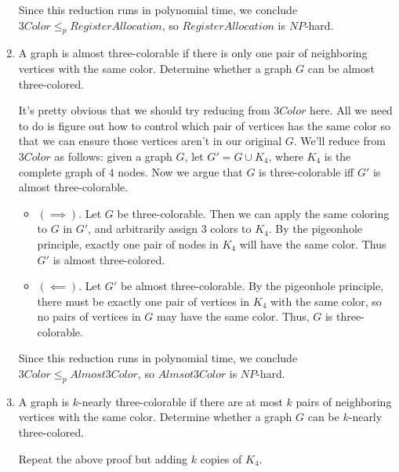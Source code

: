 \documentclass[fleqn]{article}
\begin{document}
\begin{enumerate}
\begin{answer}
\begin{itemize}
        \end{itemize}
        Since this reduction runs in polynomial time, we conclude $3Color \leq_p RegisterAllocation$, so $RegisterAllocation$ is $NP$-hard.
    \end{answer}
    \item A graph is almost three-colorable if there is only one pair of neighboring vertices with the same color. Determine whether a graph $G$ can be almost three-colored.
    \begin{answer}
        It's pretty obvious that we should try reducing from $3Color$ here. All we need to do is figure out how to control which pair of vertices has the same color so that we can ensure those vertices aren't in our original $G$. We'll reduce from $3Color$ as follows: given a graph $G$, let $G' = G \cup K_4$, where $K_4$ is the complete graph of $4$ nodes. Now we argue that $G$ is three-colorable iff $G'$ is almost three-colorable.
        \begin{itemize}
            \item $(\implies)$. Let $G$ be three-colorable. Then we can apply the same coloring to $G$ in $G'$, and arbitrarily assign $3$ colors to $K_4$. By the pigeonhole principle, exactly one pair of nodes in $K_4$ will have the same color. Thus $G'$ is almost three-colored.
            \item $(\impliedby)$. Let $G'$ be almost three-colorable. By the pigeonhole principle, there must be exactly one pair of vertices in $K_4$ with the same color, so no pairs of vertices in $G$ may have the same color. Thus, $G$ is three-colorable.
        \end{itemize}
        Since this reduction runs in polynomial time, we conclude $3Color \leq_p Almost3Color$, so $Almsot3Color$ is $NP$-hard.
    \end{answer}
    \item A graph is $k$-nearly three-colorable if there are at most $k$ pairs of neighboring vertices with the same color. Determine whether a graph $G$ can be $k$-nearly three-colored.
    \begin{answer}
        Repeat the above proof but adding $k$ copies of $K_4$.
    \end{answer}
\end{enumerate}
\end{document}
